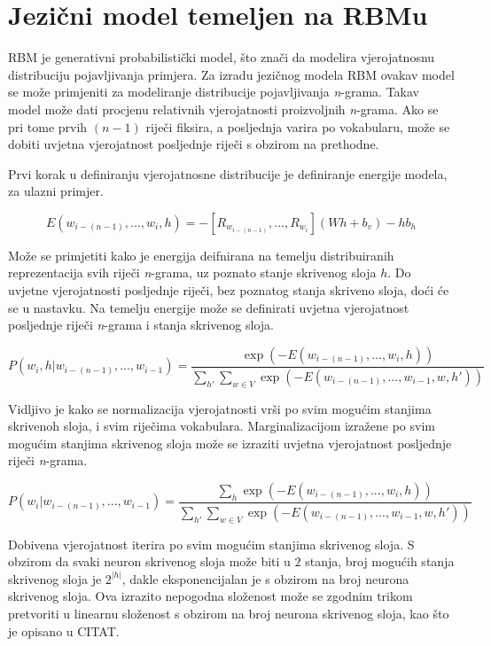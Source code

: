 \documentclass[times, utf8, diplomski, numeric]{fer}
\begin{document}
\section{Jezični model temeljen na RBMu}

RBM je generativni probabilistički model, što znači da modelira vjerojatnosnu distribuciju pojavljivanja primjera. Za izradu jezičnog modela RBM ovakav model se može primjeniti za modeliranje distribucije pojavljivanja \textit{n}-grama. Takav model može dati procjenu relativnih vjerojatnosti proizvoljnih \textit{n}-grama. Ako se pri tome prvih $(n - 1)$ riječi fiksira, a posljednja varira po vokabularu, može se dobiti uvjetna vjerojatnost posljednje riječi s obzirom na prethodne.

Prvi korak u definiranju vjerojatnosne distribucije je definiranje energije modela, za ulazni primjer.

\[
E(w_{i - (n - 1)}, ... , w_i, h) =  - \left[R_{w_{i - (n - 1)}}, ... , R_{w_i} \right] (W h + b_v) - h b_h
\]

Može se primjetiti kako je energija deifnirana na temelju distribuiranih reprezentacija svih riječi \textit{n}-grama, uz poznato stanje skrivenog sloja $h$. Do uvjetne vjerojatnosti posljednje riječi, bez poznatog stanja skriveno sloja, doći će se u nastavku. Na temelju energije može se definirati uvjetna vjerojatnost posljednje riječi \textit{n}-grama i stanja skrivenog sloja.

\[
P(w_i, h | w_{i - (n - 1)}, ... , w_{i - 1})
 = \frac{\exp(-E(w_{i - (n - 1)}, ... , w_i, h))}
  {\sum_{h'} \sum_{w \in V} \exp(-E(w_{i - (n - 1)}, ... , w_{i - 1}, w, h'))}
\]

Vidljivo je kako se normalizacija vjerojatnosti vrši po svim mogućim stanjima skrivenoh sloja, i svim riječima vokabulara. Marginalizacijom izražene po svim mogućim stanjima skrivenog sloja može se izraziti uvjetna vjerojatnost posljednje riječi \textit{n}-grama.

\[
P(w_i | w_{i - (n - 1)}, ... , w_{i - 1})
 = \frac{\sum_h \exp(-E(w_{i - (n - 1)}, ... , w_i, h))}
  {\sum_{h'} \sum_{w \in V} \exp(-E(w_{i - (n - 1)}, ... , w_{i - 1}, w, h'))}
\]

Dobivena vjerojatnost iterira po svim mogućim stanjima skrivenog sloja. S obzirom da svaki neuron skrivenog sloja može biti u $2$ stanja, broj mogućih stanja skrivenog sloja je $2^{|h|}$, dakle eksponencijalan je s obzirom na broj neurona skrivenog sloja. Ova izrazito nepogodna složenost može se zgodnim trikom pretvoriti u linearnu složenost s obzirom na broj neurona skrivenog sloja, kao što je opisano u CITAT.
\end{document}

